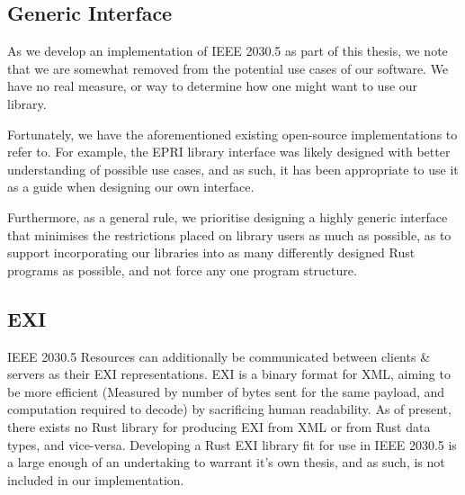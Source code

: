 \subsection{Generic Interface}
As we develop an implementation of IEEE 2030.5 as part of this thesis, we note that we are somewhat removed from the potential use cases of our software. We have no real measure, or way to determine how one might want to use our library. 

Fortunately, we have the aforementioned existing open-source implementations to refer to. For example, the EPRI library interface was likely designed with better understanding of possible use cases, and as such, it has been appropriate to use it as a guide when designing our own interface.

Furthermore, as a general rule, we prioritise designing a highly generic interface that minimises the restrictions placed on library users as much as possible, as to support incorporating our libraries into as many differently designed Rust programs as possible, and not force any one program structure.

\subsection{EXI}
IEEE 2030.5 Resources can additionally be communicated between clients \& servers as their EXI representations. EXI is a binary format for XML, aiming to be more efficient (Measured by number of bytes sent for the same payload, and computation required to decode) by sacrificing human readability. As of present, there exists no Rust library for producing EXI from XML or from Rust data types, and vice-versa.
Developing a Rust EXI library fit for use in IEEE 2030.5 is a large enough of an undertaking to warrant it's own thesis, and as such, is not included in our implementation.